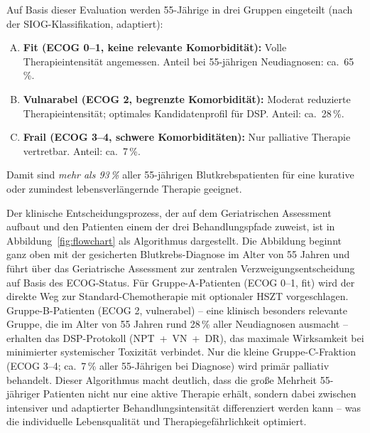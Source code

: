﻿\documentclass[12pt,a4paper]{article}
\theoremstyle{definition}
\begin{document}
Auf Basis dieser Evaluation werden 55-Jährige in drei Gruppen eingeteilt (nach der
SIOG-Klassifikation, adaptiert):
\begin{enumerate}[A.]
  \item \textbf{Fit (ECOG 0--1, keine relevante Komorbidität):} Volle
        Therapieintensität angemessen. Anteil bei 55-jährigen Neudiagnosen: ca.\ 65\,\%.
  \item \textbf{Vulnarabel (ECOG 2, begrenzte Komorbidität):} Moderat reduzierte
        Therapieintensität; optimales Kandidatenprofil für DSP. Anteil: ca.\ 28\,\%.
  \item \textbf{Frail (ECOG 3--4, schwere Komorbiditäten):} Nur palliative
        Therapie vertretbar. Anteil: ca.\ 7\,\%.
\end{enumerate}

Damit sind \emph{mehr als 93\,\%} aller 55-jährigen Blutkrebspatienten für eine
kurative oder zumindest lebensverlängernde Therapie geeignet.

Der klinische Entscheidungsprozess, der auf dem Geriatrischen Assessment aufbaut
und den Patienten einem der drei Behandlungspfade zuweist, ist in
Abbildung~\ref{fig:flowchart} als Algorithmus dargestellt. Die Abbildung beginnt
ganz oben mit der gesicherten Blutkrebs-Diagnose im Alter von 55 Jahren und führt
über das Geriatrische Assessment zur zentralen Verzweigungsentscheidung auf Basis
des ECOG-Status. Für Gruppe-A-Patienten (ECOG 0--1, fit) wird der direkte Weg
zur Standard-Chemotherapie mit optionaler HSZT vorgeschlagen. Gruppe-B-Patienten
(ECOG 2, vulnerabel) -- eine klinisch besonders relevante Gruppe, die im Alter
von 55 Jahren rund 28\,\% aller Neudiagnosen ausmacht -- erhalten das DSP-Protokoll
(NPT~+~VN~+~DR), das maximale Wirksamkeit bei minimierter systemischer Toxizität
verbindet. Nur die kleine Gruppe-C-Fraktion (ECOG 3--4; ca.~7\,\% aller 55-Jährigen
bei Diagnose) wird primär palliativ behandelt. Dieser Algorithmus macht deutlich,
dass die große Mehrheit 55-jähriger Patienten nicht nur eine aktive Therapie
erhält, sondern dabei zwischen intensiver und adaptierter Behandlungsintensität
differenziert werden kann -- was die individuelle Lebensqualität und
Therapiegefährlichkeit optimiert.
\end{document}
